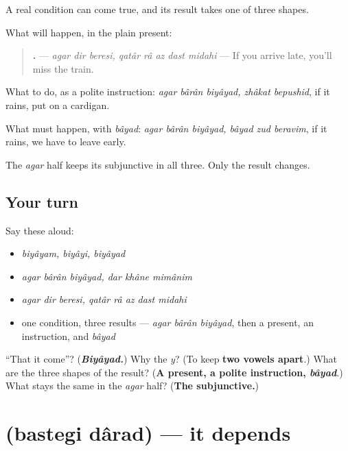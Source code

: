 \begin{grammarlens}[title={Grammar Lens: three shapes for the result}]
A real condition can come true, and its result takes one of three shapes.

What will happen, in the plain present:

\begin{quote}
\textbf{       .} — \emph{agar dir beresi, qatâr râ az dast midahi} — If you arrive late, you'll miss the train.
\end{quote}

What to do, as a polite instruction: \emph{agar bârân biyâyad, zhâkat bepushid}, if it rains, put on a cardigan.

What must happen, with \emph{bâyad}: \emph{agar bârân biyâyad, bâyad zud beravim}, if it rains, we have to leave early.

The \emph{agar} half keeps its subjunctive in all three. Only the result changes.
\end{grammarlens}

\subsection*{Your turn}
Say these aloud:

\begin{itemize}
\raggedright
  \item \emph{biyâyam, biyâyi, biyâyad}
  \item \emph{agar bârân biyâyad, dar khâne mimânim}
  \item \emph{agar dir beresi, qatâr râ az dast midahi}
  \item one condition, three results — \emph{agar bârân biyâyad}, then a present, an instruction, and \emph{bâyad}
\end{itemize}

\begin{tcolorbox}[breakable,colback=teal!4,colframe=teal!35!black,title={Before you move on}]
\textquotedblleft{}That it come\textquotedblright{}? (\emph{\textbf{Biyâyad.}}) Why the \emph{y}? (To keep \textbf{two vowels apart}.) What are the three shapes of the result? (\textbf{A present, a polite instruction, \emph{bâyad}}.) What stays the same in the \emph{agar} half? (\textbf{The subjunctive.})
\end{tcolorbox}
\section[\texorpdfstring{\fa{بستگی} \fa{دارد} (bastegi dârad)}{بستگی دارد (bastegi dârad)}]{  (bastegi dârad) — it depends}

